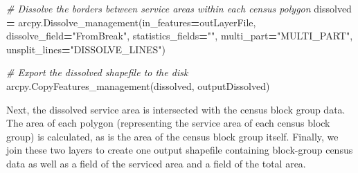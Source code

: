 \documentclass[11pt,]{article}
\newenvironment{Shaded}{\begin{snugshade}}{\end{snugshade}}
\newcommand{\StringTok}[1]{\textcolor[rgb]{0.31,0.60,0.02}{{#1}}}
\newcommand{\CommentTok}[1]{\textcolor[rgb]{0.56,0.35,0.01}{\textit{{#1}}}}
\newcommand{\OperatorTok}[1]{\textcolor[rgb]{0.81,0.36,0.00}{\textbf{{#1}}}}
\newcommand{\NormalTok}[1]{{#1}}
\begin{document}
\begin{Shaded}
\begin{Highlighting}[]

    \CommentTok{# Dissolve the borders between service areas within each census polygon}
    \NormalTok{dissolved }\OperatorTok{=} \NormalTok{arcpy.Dissolve_management(in_features}\OperatorTok{=}\NormalTok{outLayerFile,}
                                       \NormalTok{dissolve_field}\OperatorTok{=}\StringTok{"FromBreak"}\NormalTok{,}
                                       \NormalTok{statistics_fields}\OperatorTok{=}\StringTok{""}\NormalTok{,}
                                       \NormalTok{multi_part}\OperatorTok{=}\StringTok{"MULTI_PART"}\NormalTok{,}
                                       \NormalTok{unsplit_lines}\OperatorTok{=}\StringTok{"DISSOLVE_LINES"}\NormalTok{)}

    \CommentTok{# Export the dissolved shapefile to the disk}
    \NormalTok{arcpy.CopyFeatures_management(dissolved, outputDissolved)}
\end{Highlighting}
\end{Shaded}

\noindent Next, the dissolved service area is intersected with the
census block group data. The area of each polygon (representing the
service area of each census block group) is calculated, as is the area
of the census block group itself. Finally, we join these two layers to
create one output shapefile containing block-group census data as well
as a field of the serviced area and a field of the total area.
\end{document}
